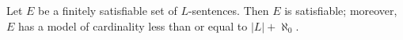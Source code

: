 Let $E$ be a finitely satisfiable set of $L$-sentences. Then $E$ is satisfiable; moreover, $E$ has a model of cardinality less than or equal to $|L| + \aleph_0$.
